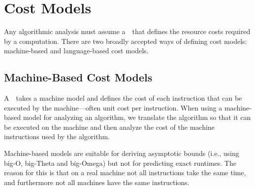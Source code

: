 \chapter{Cost Models}
\label{ch:analysis::models}

\begin{cluster}
\label{grp:prmbl:analysis::models::algorithmic}

\begin{preamble}
\label{prmbl:analysis::models::algorithmic}
Any algorithmic analysis must assume a~~that defines
the resource costs required by a computation.
There are two broadly accepted ways of defining cost models:
machine-based and language-based cost models.

\end{preamble}
\end{cluster}


\section{Machine-Based Cost Models}
\label{sec:analysis::models::machine-based-cost-models}

\begin{cluster}
\label{grp:def:analysis::models::machine-based-cost-model}

\begin{definition}
\label{def:analysis::models::machine-based-cost-model}
A~~takes a machine model and defines the
cost of each instruction that can be executed by the machine---often
unit cost per instruction.
When using a machine-based model for analyzing an algorithm, we
translate the algorithm so that it can be executed on the machine and
then analyze the cost of the machine instructions used by the algorithm.

\end{definition}
\end{cluster}

\begin{cluster}
\label{grp:rmrk:analysis::models::machine-based}

\begin{remark}
\label{rmrk:analysis::models::machine-based}
Machine-based models are suitable for deriving asymptotic bounds
(i.e., using big-O, big-Theta and big-Omega) but not for predicting
exact runtimes.   The reason for this is that on a real machine not all
instructions take the same time, and furthermore not all machines have
the same instructions.

\end{remark}
\end{cluster}


